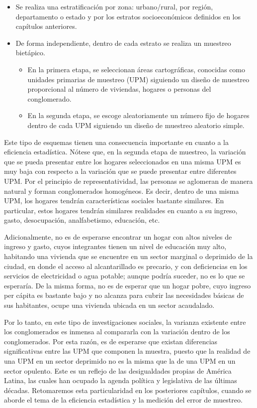 \documentclass[
  12pt,
]{book}
\providecommand{\tightlist}{%
  \setlength{\itemsep}{0pt}\setlength{\parskip}{0pt}}
\begin{document}
\begin{itemize}
\tightlist
\item
  Se realiza una estratificación por zona: urbano/rural, por región, departamento o estado y por los estratos socioeconómicos definidos en los capítulos anteriores.
\item
  De forma independiente, dentro de cada estrato se realiza un muestreo bietápico.

  \begin{itemize}
  \tightlist
  \item
    En la primera etapa, se seleccionan áreas cartográficas, conocidas como unidades primarias de muestreo (UPM) siguiendo un diseño de muestreo proporcional al número de viviendas, hogares o personas del conglomerado.
  \item
    En la segunda etapa, se escoge aleatoriamente un número fijo de hogares dentro de cada UPM siguiendo un diseño de muestreo aleatorio simple.
  \end{itemize}
\end{itemize}

Este tipo de esquemas tienen una consecuencia importante en cuanto a la eficiencia estadística. Nótese que, en la segunda etapa de muestreo, la variación que se pueda presentar entre los hogares seleccionados en una misma UPM es muy baja con respecto a la variación que se puede presentar entre diferentes UPM. Por el principio de representatividad, las personas se aglomeran de manera natural y forman conglomerados homogéneos. Es decir, dentro de una misma UPM, los hogares tendrán características sociales bastante similares. En particular, estos hogares tendrán similares realidades en cuanto a su ingreso, gasto, desocupación, analfabetismo, educación, etc.

Adicionalmente, no es de esperarse encontrar un hogar con altos niveles de ingreso y gasto, cuyos integrantes tienen un nivel de educación muy alto, habitando una vivienda que se encuentre en un sector marginal o deprimido de la ciudad, en donde el acceso al alcantarillado es precario, y con deficiencias en los servicios de electricidad o agua potable; aunque podría suceder, no es lo que se esperaría. De la misma forma, no es de esperar que un hogar pobre, cuyo ingreso per cápita es bastante bajo y no alcanza para cubrir las necesidades básicas de sus habitantes, ocupe una vivienda ubicada en un sector acaudalado.

Por lo tanto, en este tipo de investigaciones sociales, la varianza existente entre los conglomerados es inmensa al compararla con la variación dentro de los conglomerados. Por esta razón, es de esperarse que existan diferencias significativas entre las UPM que componen la muestra, puesto que la realidad de una UPM en un sector deprimido no es la misma que la de una UPM en un sector opulento. Este es un reflejo de las desigualdades propias de América Latina, las cuales han ocupado la agenda política y legislativa de las últimas décadas. Retomaremos esta particularidad en los posteriores capítulos, cuando se aborde el tema de la eficiencia estadística y la medición del error de muestreo.
\end{document}
